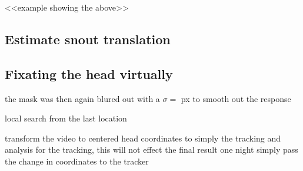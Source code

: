     <<example showing the above>>

\subsection{Estimate snout translation}
    
\subsection{Fixating the head virtually}

    the mask was then again blured out with a $\sigma=$ px to smooth out the response


    local search from the last location

    transform the video to centered head coordinates to simply the tracking and analysis for the tracking, this will not effect the final result one night simply pass the change in coordinates to the tracker 






